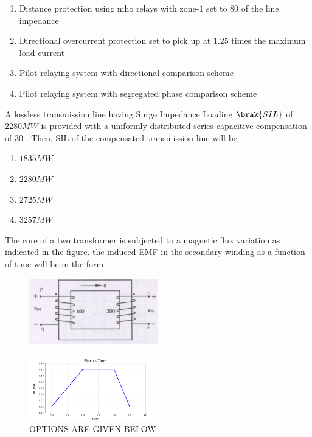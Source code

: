         \begin{enumerate}
            \item Distance protection using mho relays with zone-$1$ set to $80$ of the line impedance
            \item Directional overcurrent protection set to pick up at $1.25$ times the maximum load current
            \item Pilot relaying system with directional comparison scheme
            \item Pilot relaying system with segregated phase comparison scheme
        \end{enumerate}

    \item A lossless transmission line having Surge Impedance Loading          $\brak{SIL}$ of $2280 MW$ is provided with a uniformly distributed series capacitive compensation of  
 $30$ . Then, SIL of the compensated transmission line will be  

        \begin{enumerate}
            \item $1835 MW$
            \item $2280 MW$
            \item $2725 MW$
            \item $3257 MW$
        \end{enumerate}       


     \item The core of a two transformer is subjected to a magnetic flux variation as indicated in the figure. the induced EMF in the secondary winding as a function of time will be in the form.

   \begin{figure}[h!]
    \centering
      \hspace{-1cm}
      \includegraphics[width=0.5\textwidth]{figs/Screenshot from 2024-10-26 12-11-33.png}
      
      \label{fig:your_label}
    \end{figure}

    \begin{figure}[h!]
    \centering
      \hspace{-1cm}
      \includegraphics[width=0.5\textwidth]{figs/Figure_4.png}
      \caption{OPTIONS ARE GIVEN BELOW}
      \label{fig:your_label}
    \end{figure}


